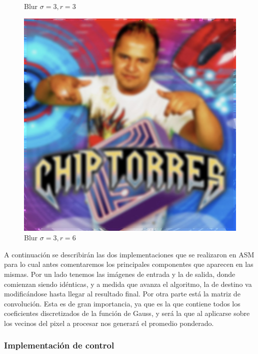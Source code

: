 \begin{figure}[H]
\begin{minipage}{.3\textwidth}
		\caption{Blur  $\sigma = 3, r = 3$}
		\label{fig:blur_s3_r3}
	\end{minipage}\hfill
	\begin{minipage}{.3\textwidth}
		\centering
		\includegraphics[width=\linewidth]{imgs/blur_s3_r6.jpg}
		\caption{Blur $\sigma = 3, r = 6$}
		\label{fig:blur_s3_r6}
	\end{minipage}
\end{figure}


A continuación se describirán las dos implementaciones que se realizaron en ASM
para lo cual antes comentaremos los principales componentes que aparecen
en las mismas. Por un lado tenemos las imágenes de entrada y la de salida, donde
comienzan siendo idénticas, y a medida que avanza el algoritmo, la de destino va
modificándose hasta llegar al resultado final. Por otra parte está la matriz de
convolución. Esta es de gran importancia, ya que es la que contiene todos los
coeficientes discretizados de la función de Gauss, y será la que al aplicarse
sobre los vecinos del pixel a procesar nos generará el promedio ponderado.

\subsubsection{Implementación de control}

